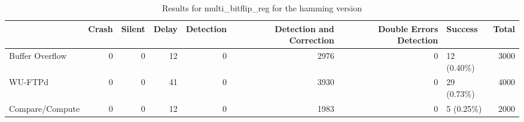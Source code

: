 \begin{table}[t]
	\centering
	\caption{Results for multi_bitflip_reg for the hamming version}
	\label{table:end_sim_by_status_hamming_5_multi_bitflip_reg}
	\begin{tabular}{lrrrrrrlr}
		\toprule
		                & Crash & Silent & Delay & Detection & Detection and Correction & Double Errors Detection & Success     & Total \\
		\midrule
		Buffer Overflow & 0     & 0      & 12    & 0         & 2976                     & 0                       & 12 (0.40\%) & 3000  \\
		WU-FTPd         & 0     & 0      & 41    & 0         & 3930                     & 0                       & 29 (0.73\%) & 4000  \\
		Compare/Compute & 0     & 0      & 12    & 0         & 1983                     & 0                       & 5 (0.25\%)  & 2000  \\
		\bottomrule
	\end{tabular}
\end{table}
